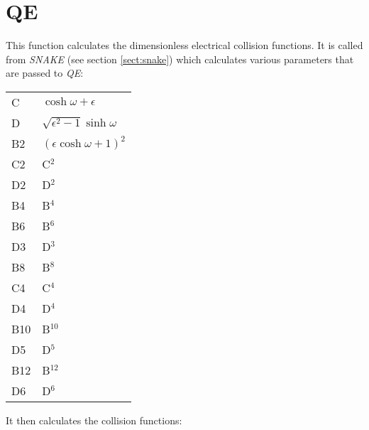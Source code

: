 \section{QE}
\label{sect:qe}

\noindent This function calculates the dimensionless electrical
collision functions. It is called from {\em SNAKE} (see section
\ref{sect:snake}) which calculates various parameters that are passed
to {\em QE}:\\

\begin{tabular}{ll}
C & $\cosh\omega + \epsilon$\\
D & $\sqrt{\epsilon^2-1} \sinh\omega$\\
B2 & $(\epsilon \cosh\omega + 1)^2$\\
C2 & C$^2$\\
D2 & D$^2$\\
B4 & B$^4$\\
B6 & B$^6$\\
D3 & D$^3$\\
B8 & B$^8$\\
C4 & C$^4$\\
D4 & D$^4$\\
B10 & B$^{10}$\\
D5 & D$^5$\\
B12 & B$^{12}$\\
D6 & D$^6$\\
\end{tabular}

\noindent It then calculates the collision functions:\\

